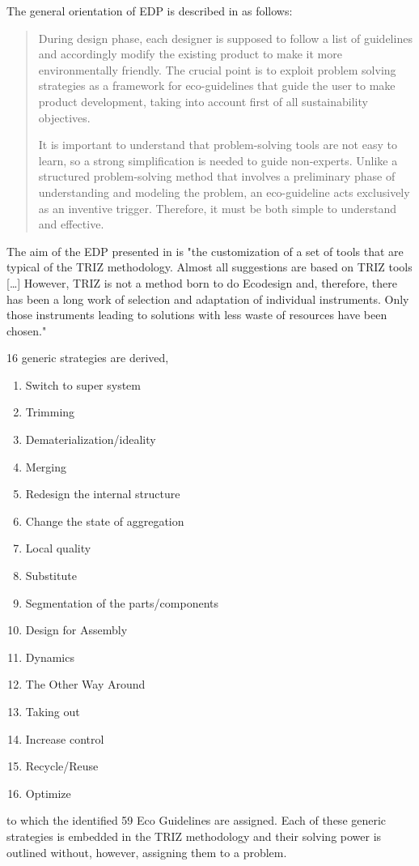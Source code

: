 \documentclass[11pt,a4paper]{article}
\begin{document}
The general orientation of EDP is described in \cite[p. 3]{Russo2020} as
follows:
\begin{quote}
  During design phase, each designer is supposed to follow a list of
  guidelines and accordingly modify the existing product to make it more
  environmentally friendly. The crucial point is to exploit problem solving
  strategies as a framework for eco-guidelines that guide the user to make
  product development, taking into account first of all sustainability
  objectives.

  It is important to understand that problem-solving tools are not easy to
  learn, so a strong simplification is needed to guide non-experts. Unlike a
  structured problem-solving method that involves a preliminary phase of
  understanding and modeling the problem, an eco-guideline acts exclusively as
  an inventive trigger. Therefore, it must be both simple to understand and
  effective.
\end{quote}

The aim of the EDP presented in \cite{Russo2020} is "the customization of a
set of tools that are typical of the TRIZ methodology. Almost all suggestions
are based on TRIZ tools [\ldots] However, TRIZ is not a method born to do
Ecodesign and, therefore, there has been a long work of selection and
adaptation of individual instruments. Only those instruments leading to
solutions with less waste of resources have been chosen."

16 generic strategies are derived,
\begin{enumerate}
\item Switch to super system
\item Trimming
\item Dematerialization/ideality
\item Merging
\item Redesign the internal structure
\item Change the state of aggregation
\item Local quality
\item Substitute
\item Segmentation of the parts/components
\item Design for Assembly
\item Dynamics
\item The Other Way Around
\item Taking out
\item Increase control
\item Recycle/Reuse
\item Optimize
\end{enumerate}
to which the identified 59 Eco Guidelines are assigned. Each of these generic
strategies is embedded in the TRIZ methodology and their solving power is
outlined without, however, assigning them to a problem.
\end{document}
